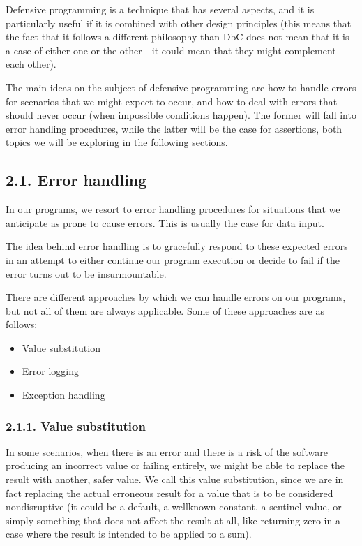 \documentclass[a4paper,10pt,english]{sphinxmanual}
\begin{document}
Defensive programming is a technique that has several aspects, and it is particularly useful if it is combined
with other design principles (this means that the fact that it follows a different philosophy than DbC does
not mean that it is a case of either one or the other—it could mean that they might complement each other).

The main ideas on the subject of defensive programming are how to handle errors for scenarios that we might
expect to occur, and how to deal with errors that should never occur (when impossible conditions happen). The
former will fall into error handling procedures, while the latter will be the case for assertions, both topics
we will be exploring in the following sections.


\subsection{2.1. Error handling}
\label{\detokenize{chapters/3_general_traits/index:error-handling}}
In our programs, we resort to error handling procedures for situations that we anticipate as prone to cause
errors. This is usually the case for data input.

The idea behind error handling is to gracefully respond to these expected errors in an attempt to either
continue our program execution or decide to fail if the error turns out to be insurmountable.

There are different approaches by which we can handle errors on our programs, but not all of them are always
applicable. Some of these approaches are as follows:
\begin{itemize}
\item {} 
Value substitution

\item {} 
Error logging

\item {} 
Exception handling

\end{itemize}


\subsubsection{2.1.1. Value substitution}
\label{\detokenize{chapters/3_general_traits/index:value-substitution}}
In some scenarios, when there is an error and there is a risk of the software producing an incorrect value or
failing entirely, we might be able to replace the result with another, safer value. We call this value
substitution, since we are in fact replacing the actual erroneous result for a value that is to be considered
non\sphinxhyphen{}disruptive (it could be a default, a well\sphinxhyphen{}known constant, a sentinel value, or simply something that does
not affect the result at all, like returning zero in a case where the result is intended to be applied to a
sum).
\end{document}
